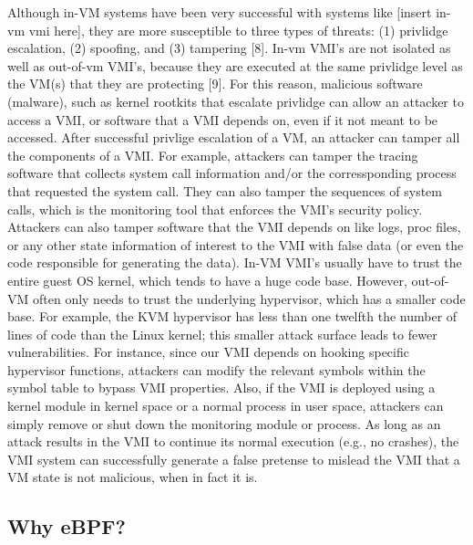 \documentclass{report}
\begin{document}
\begin{spacing}{1.5}
{\large
Although in-VM systems have been very successful with systems like [insert in-vm vmi here], they are more susceptible to three types of threats: (1) privlidge escalation, (2) spoofing, and (3) tampering [8]. In-vm VMI's are not isolated as well as out-of-vm VMI's, because they are executed at the same privlidge level as the VM(s) that they are protecting [9]. For this reason, malicious software (malware), such as kernel rootkits that escalate privlidge can allow an attacker to access a VMI, or software that a VMI depends on, even if it not meant to be accessed. After successful privlige escalation of a VM, an attacker can tamper all the components of a VMI. For example, attackers can tamper the tracing software that collects system call information and/or the corressponding process that requested the system call. They can also tamper the sequences of system calls, which is the monitoring tool that enforces the VMI's security policy. Attackers can also tamper software that the VMI depends on like logs, proc files, or any other state information of interest to the VMI with false data (or even the code responsible for generating the data). In-VM VMI's usually have to trust the entire guest OS kernel, which tends to have a huge code base. However, out-of-VM often only needs to trust the underlying hypervisor, which has a smaller code base. For example, the KVM hypervisor has less than one twelfth the number of lines of code than the Linux kernel; this smaller attack surface leads to fewer vulnerabilities. For instance, since our VMI depends on hooking specific hypervisor functions, attackers can modify the relevant symbols within the symbol table to bypass VMI properties. Also, if the VMI is deployed using a kernel module in kernel space or a normal process in user space, attackers can simply remove or shut down the monitoring module or process. As long as an attack results in the VMI to continue its normal execution (e.g., no crashes), the VMI system can successfully generate a false pretense to mislead the VMI that a VM state is not malicious, when in fact it is. 
}














\subsection{Why eBPF?}
















\end{spacing}
\end{document}
